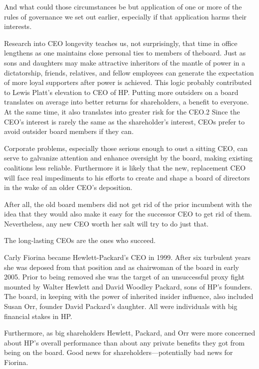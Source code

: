 \documentclass[10pt]{article}
\begin{document}
{\large And what could those circumstances be but application of one or more of
the rules of governance we set out earlier, especially if that application harms
their interests.}

{\large Research into CEO longevity teaches us, not surprisingly, that time in
office lengthens as one maintains close personal ties to members of theboard.
Just as sons and daughters may make attractive inheritors of the mantle of power
in a dictatorship, friends, relatives, and fellow employees can generate the
expectation of more loyal supporters after power is achieved. This logic probably
contributed to Lewis Platt's elevation to CEO of HP. Putting more outsiders on a
board translates on average into better returns for shareholders, a benefit to
everyone. At the same time, it also translates into greater risk for the CEO.2
Since the CEO's interest is rarely the same as the shareholder's interest, CEOs
prefer to avoid outsider board members if they can.}

{\large Corporate problems, especially those serious enough to oust a sitting
CEO, can serve to galvanize attention and enhance oversight by the board, making
existing coalitions less reliable. Furthermore it is likely that the new,
replacement CEO will face real impediments to his efforts to create and shape a
board of directors in the wake of an older CEO's deposition.}

{\large After all, the old board members did not get rid of the prior incumbent
with the idea that they would also make it easy for the successor CEO to get rid
of them. Nevertheless, any new CEO worth her salt will try to do just that.}

{\large The long-lasting CEOs are the ones who succeed.}

{\large Carly Fiorina became Hewlett-Packard's CEO in 1999. After six turbulent
years she was deposed from that position and as chairwoman of the board in early
2005. Prior to being removed she was the target of an unsuccessful proxy fight
mounted by Walter Hewlett and David Woodley Packard, sons of HP's founders. The
board, in keeping with the power of inherited insider influence, also included
Susan Orr, founder David Packard's daughter. All were individuals with big
financial stakes in HP.}

{\large Furthermore, as big shareholders Hewlett, Packard, and Orr were more
concerned about HP's overall performance than about any private benefits they got
from being on the board. Good news for shareholders---potentially bad news for
Fiorina.}
\end{document}

